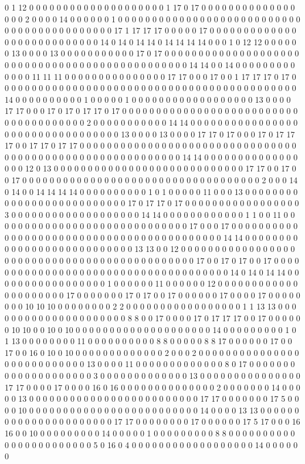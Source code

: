 0 1 12 0 0 0 0 0 0 0 0 0 0 0 0 0 0 0 0 0 0 0 0 1 17 0 17 0 0 0 0 0 0 0 0 0 0 0 0 0 0 0 0 0 2 0 0 0 0 14 0 0 0 0 0 0 1 0 0 0 0 0 0 0 0 0 0 0 0 0 0 0 0 0 0 0 0 0 0 0 0 0 0 0 0 0 0 0 0 0 0 0 0 0 0 0 0 0 0 0 17 1 17 17 17 0 0 0 0 0 17 0 0 0 0 0 0 0 0 0 0 0 0 0 0 0 0 0 0 0 0 0 0 0 0 0 0 0 14 0 14 0 14 14 0 14 14 14 14 0 0 0 1 0 12 12 0 0 0 0 0 0 13 0 0 0 0 13 0 0 0 0 0 0 0 0 0 0 0 17 0 17 0 0 0 0 0 0 0 0 0 0 0 0 0 0 0 0 0 0 0 0 0 0 0 0 0 0 0 0 0 0 0 0 0 0 0 0 0 0 0 0 0 0 0 0 0 0 0 14 14 0 0 14 0 0 0 0 0 0 0 0 0 0 0 0 0 11 11 11 0 0 0 0 0 0 0 0 0 0 0 0 0 0 0 17 17 0 0 0 17 0 0 1 17 17 17 0 17 0 0 0 0 0 0 0 0 0 0 0 0 0 0 0 0 0 0 0 0 0 0 0 0 0 0 0 0 0 0 0 0 0 0 0 0 0 0 0 0 0 0 0 0 14 0 0 0 0 0 0 0 0 0 0 1 0 0 0 0 0 1 0 0 0 0 0 0 0 0 0 0 0 0 0 0 0 0 0 0 13 0 0 0 0 17 17 0 0 0 17 0 17 0 17 17 0 17 0 0 0 0 0 0 0 0 0 0 0 0 0 0 0 0 0 0 0 0 0 0 0 0 0 0 0 0 0 0 0 0 0 0 0 0 0 0 2 0 0 0 0 0 0 0 0 0 0 0 14 14 0 0 0 0 0 0 0 0 0 0 0 0 0 0 0 0 0 0 0 0 0 0 0 0 0 0 0 0 0 0 0 0 0 13 0 0 0 0 13 0 0 0 0 17 17 0 17 0 0 0 17 0 17 17 17 0 0 17 17 0 17 17 0 0 0 0 0 0 0 0 0 0 0 0 0 0 0 0 0 0 0 0 0 0 0 0 0 0 0 0 0 0 0 0 0 0 0 0 0 0 0 0 0 0 0 0 0 0 0 0 0 0 0 0 0 0 0 0 0 0 14 14 0 0 0 0 0 0 0 0 0 0 0 0 0 0 0 0 0 12 0 13 0 0 0 0 0 0 0 0 0 0 0 0 0 0 0 0 0 0 0 0 0 0 0 0 0 0 0 0 17 17 0 0 17 0 0 17 0 0 0 0 0 0 0 0 0 0 0 0 0 0 0 0 0 0 0 0 0 0 0 0 0 0 0 0 0 0 0 0 0 0 0 2 0 0 0 14 0 14 0 0 14 14 14 14 0 0 0 0 0 0 0 0 0 0 1 0 1 0 0 0 0 0 11 0 0 0 13 0 0 0 0 0 0 0 0 0 0 0 0 0 0 0 0 0 0 0 0 0 0 0 0 0 0 17 0 17 17 0 17 0 0 0 0 0 0 0 0 0 0 0 0 0 0 0 0 0 3 0 0 0 0 0 0 0 0 0 0 0 0 0 0 0 0 0 0 0 14 14 0 0 0 0 0 0 0 0 0 0 0 0 1 1 0 0 11 0 0 0 0 0 0 0 0 0 0 0 0 0 0 0 0 0 0 0 0 0 0 0 0 0 0 0 0 0 17 0 0 0 17 0 0 0 0 0 0 0 0 0 0 0 0 0 0 0 0 0 0 0 0 0 0 0 0 0 0 0 0 0 0 0 0 0 0 0 0 0 0 0 0 0 0 14 14 0 0 0 0 0 0 0 0 0 0 0 0 0 0 0 0 0 0 0 0 0 0 0 0 0 0 0 13 13 0 0 12 0 0 0 0 0 0 0 0 0 0 0 0 0 0 0 0 0 0 0 0 0 0 0 0 0 0 0 0 0 0 0 0 0 0 0 0 0 0 0 0 0 0 0 0 0 17 0 0 17 0 17 0 0 17 0 0 0 0 0 0 0 0 0 0 0 0 0 0 0 0 0 0 0 0 0 0 0 0 0 0 0 0 0 0 0 0 0 0 0 0 0 14 0 14 0 14 14 0 0 0 0 0 0 0 0 0 0 0 0 0 0 0 0 0 1 0 0 0 0 0 0 11 0 0 0 0 0 0 12 0 0 0 0 0 0 0 0 0 0 0 0 0 0 0 0 0 0 0 0 0 17 0 0 0 0 0 0 0 17 0 17 0 0 17 0 0 0 0 0 0 17 0 0 0 0 17 0 0 0 0 0 0 0 0 10 10 10 0 0 0 0 0 0 0 0 2 2 0 0 0 0 0 0 0 0 0 0 0 0 0 0 0 0 0 1 1 13 13 0 0 0 0 0 0 0 0 0 0 0 0 0 0 0 0 0 0 0 0 0 8 8 0 0 17 0 0 0 0 17 0 17 17 17 0 0 17 0 0 0 0 0 0 10 10 0 0 10 0 10 0 0 0 0 0 0 0 0 0 0 0 0 0 0 0 0 0 0 0 0 14 0 0 0 0 0 0 0 0 0 1 0 1 13 0 0 0 0 0 0 0 0 11 0 0 0 0 0 0 0 0 0 0 8 8 0 0 0 0 0 8 8 17 0 0 0 0 0 0 17 0 0 17 0 0 16 0 10 0 10 0 0 0 0 0 0 0 0 0 0 0 0 0 2 0 0 0 2 0 0 0 0 0 0 0 0 0 0 0 0 0 0 0 0 0 0 0 0 0 0 0 0 0 0 0 13 0 0 0 0 11 0 0 0 0 0 0 0 0 0 0 0 0 0 8 0 17 0 0 0 0 0 0 0 0 0 0 0 0 0 0 0 0 0 0 0 0 3 0 0 0 0 0 0 0 0 0 0 0 0 0 13 0 0 0 0 0 0 0 0 0 0 0 0 0 0 0 17 17 0 0 0 0 17 0 0 0 0 16 0 16 0 0 0 0 0 0 0 0 0 0 0 0 0 0 2 0 0 0 0 0 0 0 14 0 0 0 0 0 13 0 0 0 0 0 0 0 0 0 0 0 0 0 0 0 0 0 0 0 0 0 0 0 0 0 17 17 0 0 0 0 0 0 0 17 5 0 0 0 0 10 0 0 0 0 0 0 0 0 0 0 0 0 0 0 0 0 0 0 0 0 0 0 0 0 0 14 0 0 0 0 13 13 0 0 0 0 0 0 0 0 0 0 0 0 0 0 0 0 0 0 0 0 0 0 17 17 0 0 0 0 0 0 0 0 17 0 0 0 0 0 0 17 5 17 0 0 0 16 16 0 0 10 0 0 0 0 0 0 0 0 0 14 0 0 0 0 0 1 0 0 0 0 0 0 0 0 0 8 8 0 0 0 0 0 0 0 0 0 0 0 0 0 0 0 0 0 0 0 0 0 0 0 5 0 16 0 4 0 0 0 0 0 0 0 0 0 0 0 0 0 0 0 0 0 0 14 0 0 0 0 0 0 